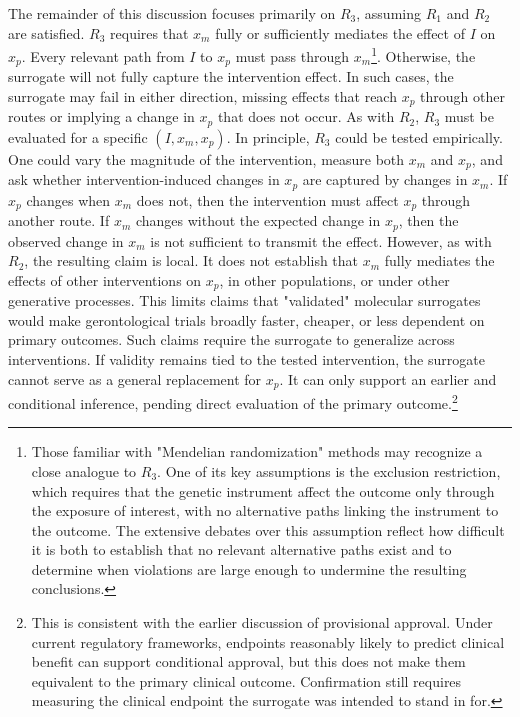 \documentclass[twocolumn]{article} %
\begin{document}
The remainder of this discussion focuses primarily on $R_3$, assuming $R_1$ and $R_2$ are satisfied. $R_3$ requires that $x_m$ fully or sufficiently mediates the effect of $I$ on $x_p$. Every relevant path from $I$ to $x_p$ must pass through $x_m$\footnote{Those familiar with "Mendelian randomization" methods may recognize a close analogue to $R_3$. One of its key assumptions is the exclusion restriction, which requires that the genetic instrument affect the outcome only through the exposure of interest, with no alternative paths linking the instrument to the outcome. The extensive debates over this assumption reflect how difficult it is both to establish that no relevant alternative paths exist and to determine when violations are large enough to undermine the resulting conclusions.}. Otherwise, the surrogate will not fully capture the intervention effect. In such cases, the surrogate may fail in either direction, missing effects that reach $x_p$ through other routes or implying a change in $x_p$ that does not occur. As with $R_2$, $R_3$ must be evaluated for a specific $(I, x_m, x_p)$. In principle, $R_3$ could be tested empirically. One could vary the magnitude of the intervention, measure both $x_m$ and $x_p$, and ask whether intervention-induced changes in $x_p$ are captured by changes in $x_m$. If $x_p$ changes when $x_m$ does not, then the intervention must affect $x_p$ through another route. If $x_m$ changes without the expected change in $x_p$, then the observed change in $x_m$ is not sufficient to transmit the effect. However, as with $R_2$, the resulting claim is local. It does not establish that $x_m$ fully mediates the effects of other interventions on $x_p$, in other populations, or under other generative processes. This limits claims that "validated" molecular surrogates would make gerontological trials broadly faster, cheaper, or less dependent on primary outcomes. Such claims require the surrogate to generalize across interventions. If validity remains tied to the tested intervention, the surrogate cannot serve as a general replacement for $x_p$. It can only support an earlier and conditional inference, pending direct evaluation of the primary outcome.\footnote{This is consistent with the earlier discussion of provisional approval. Under current regulatory frameworks, endpoints reasonably likely to predict clinical benefit can support conditional approval, but this does not make them equivalent to the primary clinical outcome. Confirmation still requires measuring the clinical endpoint the surrogate was intended to stand in for.}
\end{document}
